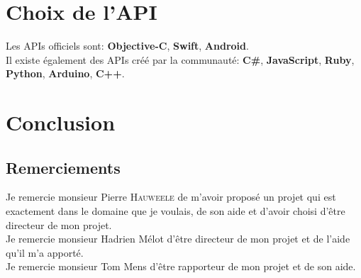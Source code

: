 \documentclass[12pt,a4paper,oneside, titlepage]{article}
\begin{document}
\section{Choix de l'API}
Les APIs officiels sont:\cite{SDKofficiels} \textbf{Objective-C}, \textbf{Swift}, \textbf{Android}.\\
Il existe également des APIs créé par la communauté:\cite{gosphero} \textbf{C\#}, \textbf{JavaScript}, \textbf{Ruby}, \textbf{Python}\cite{pythonAPI}, \textbf{Arduino}, \textbf{C++}\cite{cppAPI}.\\
\section{Conclusion}
\subsection*{Remerciements}
\noindent Je remercie monsieur Pierre \textsc{Hauweele} de m'avoir proposé un projet qui est exactement dans le domaine que je voulais, de son aide et d'avoir choisi d'être directeur de mon projet.\\

\noindent Je remercie monsieur Hadrien Mélot d'être directeur de mon projet et de l'aide qu'il m'a apporté.\\

\noindent Je remercie monsieur Tom Mens d'être rapporteur de mon projet et de son aide.\\



\end{document}
